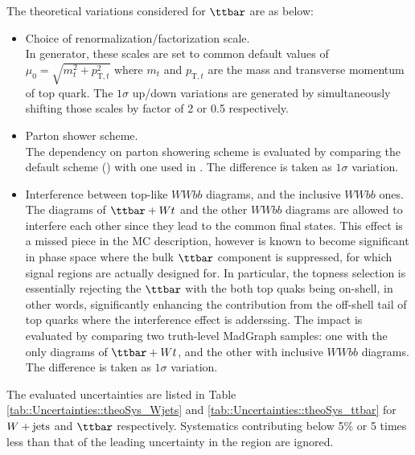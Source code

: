 The theoretical variations considered for $\ttbar$ are as below:
\begin{itemize}
\item Choice of renormalization/factorization scale.\\
In \powhegbox \mbox{\phantom{k}} generator, these scales are set to common default values of $\mu_0 = \sqrt{m_t^2+p_{\mathrm{T},t}^2}$ where $m_t$ and $p_{\mathrm{T},t}$ are the mass and transverse momentum of top quark.
The $1\sigma$ up/down variations are generated by simultaneously shifting those scales by factor of 2 or 0.5 respectively.  

\item Parton shower scheme.\\
The dependency on parton showering scheme is evaluated by comparing the default scheme (\pythiasix) with one used in \herwig.
The difference is taken as $1\sigma$ variation.

\item Interference between top-like $WWbb$ diagrams, and the inclusive $WWbb$ ones.\\
The diagrams of $\ttbar+Wt$ and the other $WWbb$ diagrams are allowed to interfere each other since they lead to the common final states.
This effect is a missed piece in the MC description, however is known to become significant in phase space where the bulk $\ttbar$ component is suppressed, for which signal regions are actually designed for.
In particular, the topness selection is essentially rejecting the $\ttbar$ with the both top quaks being on-shell, in other words, significantly enhancing the contribution from the off-shell tail of top quarks where the interference effect is adderssing. The impact is evaluated by comparing two truth-level MadGraph samples: one with the only diagrams of $\ttbar+Wt$, and the other with inclusive $WWbb$ diagrams.
The difference is taken as $1\sigma$ variation.
\end{itemize}
The evaluated uncertainties are listed in Table \ref{tab::Uncertainties::theoSys_Wjets} and \ref{tab::Uncertainties::theoSys_ttbar} for $W+\mathrm{jets}$ and $\ttbar$ respectively. Systematics contributing below 5$\%$ or 5 times less than that of the leading uncertainty in the region are ignored. \\

